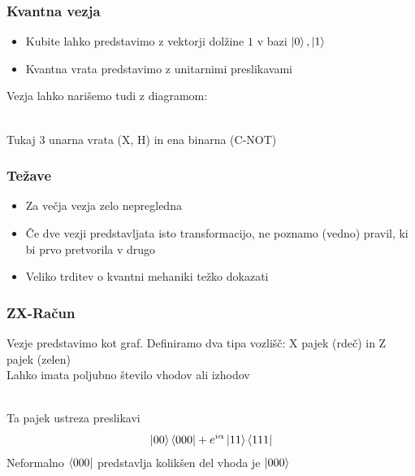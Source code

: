 \documentclass[10pt]{beamer}
\begin{document}
\begin{frame}[fragile]
  \frametitle{Kvantna vezja}
  \begin{itemize}
  \item Kubite lahko predstavimo z vektorji dolžine \(1\) v bazi \(\ket0, \ket1\)
  \item Kvantna vrata predstavimo z unitarnimi preslikavami
  \end{itemize}
  Vezja lahko narišemo tudi z diagramom:\\
  \\
  Tukaj 3 unarna vrata (X, H) in ena binarna (C-NOT)
\end{frame}
\begin{frame}
  \frametitle{Težave}
  \pause
  \begin{itemize}
  \item Za večja vezja zelo nepregledna \pause
  \item Če dve vezji predstavljata isto transformacijo, ne poznamo (vedno) pravil, ki bi prvo pretvorila v drugo\pause
  \item Veliko trditev o kvantni mehaniki težko dokazati
  \end{itemize}
\end{frame}
\begin{frame}
  \frametitle{ZX-Račun}
  Vezje predstavimo kot graf. Definiramo dva tipa vozlišč: X pajek (rdeč) in Z pajek (zelen)\\
  Lahko imata poljubno število vhodov ali izhodov\\
  \\
  Ta pajek ustreza preslikavi
  \begin{align*}
    \ket{00}\bra{000} + e^{i\alpha}\ket{11}\bra{111}
  \end{align*}
  Neformalno \(\bra{000}\) predstavlja kolikšen del vhoda je \(\ket{000}\)
\end{frame}
\end{document}
